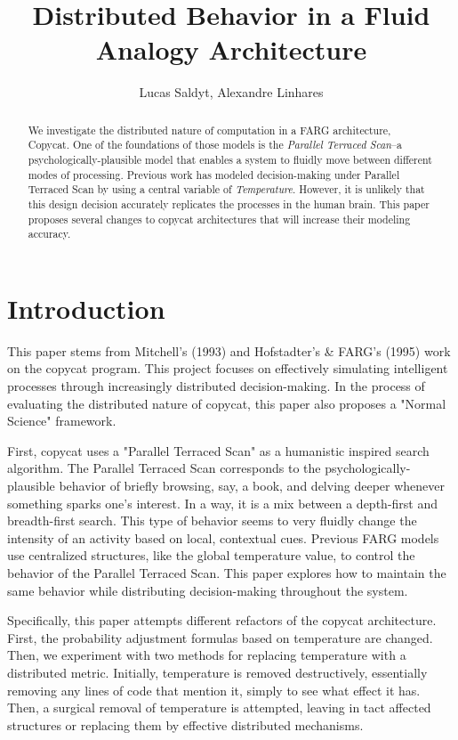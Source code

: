\documentclass[a4paper]{article}
\title{Distributed Behavior in a Fluid Analogy Architecture}
\author{Lucas Saldyt, Alexandre Linhares}
\begin{document}
\maketitle

\begin{abstract}
    We investigate the distributed nature of computation in a FARG architecture, Copycat. 
    One of the foundations of those models is the \emph{Parallel Terraced Scan}--a psychologically-plausible model that enables a system to fluidly move between different modes of processing.  
    Previous work has modeled decision-making under Parallel Terraced Scan by using a central variable of \emph{Temperature}. 
    However, it is unlikely that this design decision accurately replicates the processes in the human brain.
    This paper proposes several changes to copycat architectures that will increase their modeling accuracy.
\end{abstract}

\section{Introduction}

    This paper stems from Mitchell's (1993) and Hofstadter's \& FARG's (1995) work on the copycat program. 
    This project focuses on effectively simulating intelligent processes through increasingly distributed decision-making.
    In the process of evaluating the distributed nature of copycat, this paper also proposes a "Normal Science" framework. 

    First, copycat uses a "Parallel Terraced Scan" as a humanistic inspired search algorithm.
    The Parallel Terraced Scan corresponds to the psychologically-plausible behavior of briefly browsing, say, a book, and delving deeper whenever something sparks one's interest. 
    In a way, it is a mix between a depth-first and breadth-first search.
    This type of behavior seems to very fluidly change the intensity of an activity based on local, contextual cues. 
    Previous FARG models use centralized structures, like the global temperature value, to control the behavior of the Parallel Terraced Scan.
    This paper explores how to maintain the same behavior while distributing decision-making throughout the system.

    Specifically, this paper attempts different refactors of the copycat architecture.
    First, the probability adjustment formulas based on temperature are changed.
    Then, we experiment with two methods for replacing temperature with a distributed metric.
    Initially, temperature is removed destructively, essentially removing any lines of code that mention it, simply to see what effect it has.
    Then, a surgical removal of temperature is attempted, leaving in tact affected structures or replacing them by effective distributed mechanisms.
\end{document}
